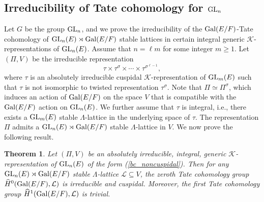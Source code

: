 \documentclass[10pt, reqno]{amsart}
\theoremstyle{plain}
\numberwithin{equation}{section} \newcommand{\di}{\operatorname{dim}}
\newtheorem{theorem}{Theorem}[subsection]
\begin{document}
\subsection{Irreducibility of 
Tate cohomology for ${\rm GL}_n$}
Let $G$ be the group ${\rm GL}_n$, and we prove the irreducibility of
the ${\rm Gal}(E/F)$-Tate cohomology of
${\rm GL}_n(E)\rtimes {\rm Gal}(E/F)$ stable lattices in certain integral
generic $\mathcal{K}$-representations of ${\rm GL}_n(E)$. Assume
that $n=\ell m$ for some integer $m\geq 1$.  Let $(\Pi,V)$ be the irreducible
representation
\begin{equation}\label{bc_noncuspidal}
\tau\times\tau^\sigma\times\cdots\times
\tau^{\sigma^{\ell-1}},
\end{equation} 
where $\tau$ is an absolutely irreducible cuspidal
$\mathcal{K}$-representation of ${\rm GL}_m(E)$ such that $\tau$ is
not isomorphic to twisted representation $\tau^\sigma$. Note that
$\Pi\simeq \Pi^\sigma$, which induces an action of ${\rm Gal}(E/F)$ on
the space $V$ that is compatible with the ${\rm Gal}(E/F)$ action on
${\rm GL}_n(E)$. We further assume that $\tau$ is integral, i.e.,
there exists a ${\rm GL}_m(E)$ stable $\Lambda$-lattice in the
underlying space of $\tau$. The representation $\Pi$ admits a
${\rm GL}_n(E)\rtimes {\rm Gal}(E/F)$ stable $\Lambda$-lattice in $V$.
We now prove the following result.
\begin{theorem}\label{Tate_bc_cuspidal}
  Let $(\Pi,V)$ be an absolutely irreducible, integral, generic
  $\mathcal{K}$-representation of ${\rm GL}_n(E)$ of the form
  (\ref{bc_noncuspidal}). Then for any
  ${\rm GL}_n(E)\rtimes {\rm Gal}(E/F)$ stable $\Lambda$-lattice
  $\mathcal{L}\subseteq V$, the zeroth Tate cohomology group
  $\widehat{H}^0({\rm Gal}(E/F),\mathcal{L})$ is irreducible and
  cuspidal. Moreover, the first Tate cohomology group
  $\widehat{H}^1({\rm Gal}(E/F),\mathcal{L})$ is trivial.
\end{theorem}
\end{document}
